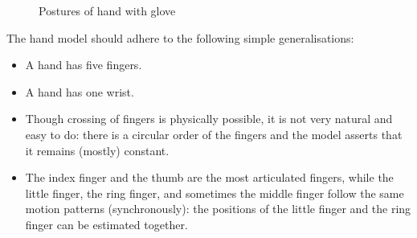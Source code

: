 \begin{figure}[H]
	\centering
	\hspace{0.03\textwidth}
	\hspace{0.03\textwidth}
	\hspace{0.03\textwidth}
	\caption{Postures of hand with glove}
	\label{fig:glove-postures}
\end{figure}

The hand model should adhere to the following simple generalisations:

\begin{itemize}
\item A hand has five fingers.
\item A hand has one wrist.
\item Though crossing of fingers is physically possible, it is not very natural and easy to do: there is a circular order of the fingers and the model asserts that it remains (mostly) constant.
\item The index finger and the thumb are the most articulated fingers, while the little finger, the ring finger, and sometimes the middle finger follow the same motion patterns (synchronously): the positions of the little finger and the ring finger can be estimated together.
\end{itemize}

